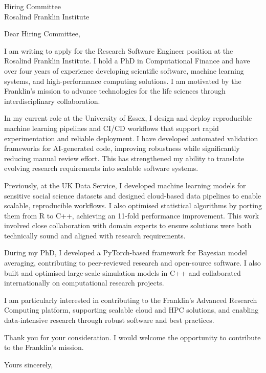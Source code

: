 \documentclass[11pt]{letter}
\begin{document}
\begin{letter}{Hiring Committee\\
Rosalind Franklin Institute}

\opening{Dear Hiring Committee,}

I am writing to apply for the Research Software Engineer position at the Rosalind Franklin Institute. I hold a PhD in Computational Finance and have over four years of experience developing scientific software, machine learning systems, and high-performance computing solutions. I am motivated by the Franklin’s mission to advance technologies for the life sciences through interdisciplinary collaboration.

In my current role at the University of Essex, I design and deploy reproducible machine learning pipelines and CI/CD workflows that support rapid experimentation and reliable deployment. I have developed automated validation frameworks for AI-generated code, improving robustness while significantly reducing manual review effort. This has strengthened my ability to translate evolving research requirements into scalable software systems.

Previously, at the UK Data Service, I developed machine learning models for sensitive social science datasets and designed cloud-based data pipelines to enable scalable, reproducible workflows. I also optimised statistical algorithms by porting them from R to C++, achieving an 11-fold performance improvement. This work involved close collaboration with domain experts to ensure solutions were both technically sound and aligned with research requirements.

During my PhD, I developed a PyTorch-based framework for Bayesian model averaging, contributing to peer-reviewed research and open-source software. I also built and optimised large-scale simulation models in C++ and collaborated internationally on computational research projects.

I am particularly interested in contributing to the Franklin’s Advanced Research Computing platform, supporting scalable cloud and HPC solutions, and enabling data-intensive research through robust software and best practices.

Thank you for your consideration. I would welcome the opportunity to contribute to the Franklin’s mission.

\closing{Yours sincerely,}

\end{letter}
\end{document}
